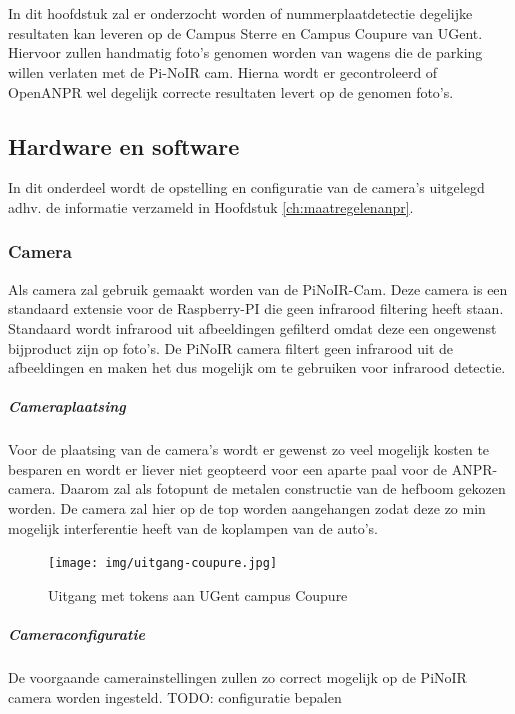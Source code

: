 
\chapter{}
\label{ch:praktischeUitvoering}
In dit hoofdstuk zal er onderzocht worden of nummerplaatdetectie degelijke resultaten kan leveren op de Campus Sterre en Campus Coupure van UGent. Hiervoor zullen handmatig foto's genomen worden van wagens die de parking willen verlaten met de Pi-NoIR cam. Hierna wordt er gecontroleerd of OpenANPR wel degelijk correcte resultaten levert op de genomen foto's.


\section{Hardware en software}
In dit onderdeel wordt de opstelling en configuratie van de camera's uitgelegd adhv. de informatie verzameld in Hoofdstuk \ref{ch:maatregelenanpr}.

\subsection{Camera}
Als camera zal gebruik gemaakt worden van de PiNoIR-Cam. Deze camera is een standaard extensie voor de Raspberry-PI die geen infrarood filtering heeft staan. Standaard wordt infrarood uit afbeeldingen gefilterd omdat deze een ongewenst bijproduct zijn op foto's. De PiNoIR camera filtert geen infrarood uit de afbeeldingen en maken het dus mogelijk om te gebruiken voor infrarood detectie.

\paragraph{Cameraplaatsing}
Voor de plaatsing van de camera's wordt er gewenst zo veel mogelijk kosten te besparen en wordt er liever niet geopteerd voor een aparte paal voor de ANPR-camera. Daarom zal als fotopunt de metalen constructie van de hefboom gekozen worden. De camera zal hier op de top worden aangehangen zodat deze zo min mogelijk interferentie heeft van de koplampen van de auto's.

\begin{figure}[h!]
	\centering
	\texttt{[image: img/uitgang-coupure.jpg]}
	\caption{Uitgang met tokens aan UGent campus Coupure}
\end{figure}

\paragraph{Cameraconfiguratie}
De voorgaande camerainstellingen zullen zo correct mogelijk op de PiNoIR camera worden ingesteld.
TODO: configuratie bepalen



